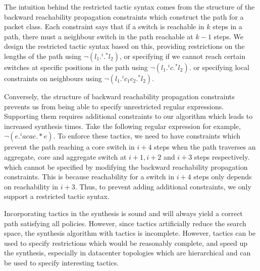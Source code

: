 The intuition behind the restricted tactic syntax comes from the structure of the backward reachability propagation 
constraints which construct the path for a packet class. Each constraint says that if a switch is reachable in $k$ steps in a path,
 there must a neighbour switch in the path reachable at $k-1$ steps. We design the restricted tactic syntax based
  on this, providing restrictions on the lengths of the path using $\neg (l_1 .^i .^* l_2)$, or specifying if we cannot 
  reach certain switches at specific positions in the path using  $\neg (l_1 .^i c .^* l_2)$. or specifying local 
  constraints on neighbours using $\neg (l_1  .^i c_1 c_2 .^* l_2)$.  
  
  Conversely, the structure of backward reachability propagation constraints 
  prevents us from being able to specify unrestricted regular expressions. Supporting them
  requires additional constraints to our algorithm which leads to increased synthesis times. 
  Take the following regular expression for example, $\neg(e .^i a c a c .*e)$. To enforce
  these tactics, we need to have constraints which prevent the path reaching a core switch in $i+4$
  steps when the path traverses an aggregate, core and aggregate switch at $i+1, i+2$ and $i+3$ steps
  respectively. which cannot be specified by modifying the backward reachability propagation 
  constraints. This is because reachability for a switch in $i + 4$ steps only depends on reachability in $i+3$.
  Thus, to prevent adding additional constraints, we only support a restricted tactic syntax.   

Incorporating tactics in the synthesis is sound and will always yield a correct path satisfying all policies.
 However, since tactics artificially reduce the search space, the synthesis algorithm with tactics is incomplete. 
 However, tactics can be used to specify restrictions which would be reasonably complete, 
 and speed up the synthesis, especially in datacenter topologies which are hierarchical 
 and can be used to specify interesting tactics. 


